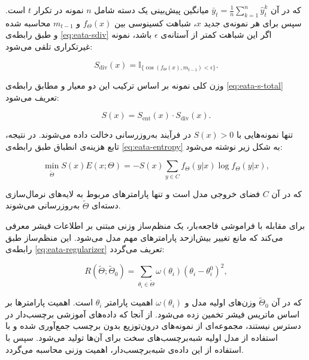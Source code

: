 که در آن \(\bar{y}_t = \frac{1}{n} \sum_{k=1}^n \hat{y}^k_t\) میانگین پیش‌بینی یک دسته شامل \(n\) نمونه در تکرار \(t\) است. سپس برای هر نمونه‌ی جدید \(x\)، شباهت کسینوسی بین \(f_{\Theta}(x)\) و \(m_{t-1}\) محاسبه شده و طبق رابطه‌ی \ref{eq:eata-sdiv} اگر این شباهت کمتر از آستانه‌ی \(\epsilon\) باشد، نمونه غیرتکراری تلقی می‌شود\cite{eata}:  

\begin{equation}
	S_{\text{div}}(x) = \mathbb{I}_{\{\cos(f_{\Theta}(x), m_{t-1}) < \epsilon\}}.
	\label{eq:eata-sdiv}
\end{equation}

وزن کلی نمونه بر اساس ترکیب این دو معیار و مطابق رابطه‌ی \ref{eq:eata-s-total} تعریف می‌شود\cite{eata}:  

\begin{equation}
	S(x) = S_{\text{ent}}(x) \cdot S_{\text{div}}(x).
	\label{eq:eata-s-total}
\end{equation}

تنها نمونه‌هایی با \(S(x) > 0\) در فرآیند به‌روزرسانی دخالت داده می‌شوند. در نتیجه، تابع هزینه‌ی انطباق طبق رابطه‌ی \ref{eq:eata-entropy} به شکل زیر نوشته می‌شود\cite{eata}:  

\begin{equation}
	\min_{\tilde{\Theta}} S(x) E(x; \Theta) = - S(x) \sum_{y \in C} f_{\Theta}(y|x) \log f_{\Theta}(y|x),
	\label{eq:eata-entropy}
\end{equation}

که در آن \(C\) فضای خروجی مدل است و تنها پارامترهای مربوط به لایه‌های نرمال‌سازی دسته‌ای \(\tilde{\Theta}\) به‌روزرسانی می‌شوند.  

برای مقابله با فراموشی فاجعه‌بار،  یک منظم‌ساز وزنی مبتنی بر اطلاعات فیشر معرفی می‌کند که مانع تغییر بیش‌ازحد پارامترهای مهم مدل می‌شود. این منظم‌ساز طبق رابطه‌ی \ref{eq:eata-regularizer} تعریف می‌گردد\cite{eata}:  

\begin{equation}
	R(\tilde{\Theta}; \tilde{\Theta}_0) = \sum_{\theta_i \in \tilde{\Theta}} \omega(\theta_i) (\theta_i - \theta_i^0)^2,
	\label{eq:eata-regularizer}
\end{equation}

که در آن \(\tilde{\Theta}_0\) وزن‌های اولیه مدل و \(\omega(\theta_i)\) اهمیت پارامتر \(\theta_i\) است. اهمیت پارامترها بر اساس ماتریس فیشر تخمین زده می‌شود. از آنجا که داده‌های آموزشی برچسب‌دار در دسترس نیستند، مجموعه‌ای از نمونه‌های درون‌توزیع بدون برچسب جمع‌آوری شده و با استفاده از مدل اولیه شبه‌برچسب‌های سخت برای آن‌ها تولید می‌شود. سپس با استفاده از این داده‌ی شبه‌برچسب‌دار، اهمیت وزنی محاسبه می‌گردد.  

